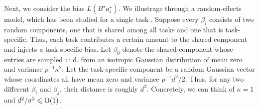 Next, we consider the bias $L(B^{\star} a^{\star}_i)$.
We illustrage through a random-effects model, which has been studied for a single task \cite{dobriban2020wonder}.
Suppose every $\beta_i$ consists of two random components, one that is shared among all tasks and one that is task-specific.
Thus, each task contributes a certain amount to the shared component and injects a task-specific bias.
Let $\beta_0$ denote the shared component whose entries are sampled i.i.d. from an isotropic Gaussian distribution of mean zero and variance $p^{-1}\kappa^2$.
Let the task-specific component be a random Gaussian vector whose coordinates all have mean zero and variance $p^{-1} d^2 / 2$.
Thus, for any two different $\beta_i$ and $\beta_j$, their distance is roughly $d^2$.
Concretely, we can think of $\kappa = 1$ and $d^2/\sigma^2 \leqslant \operatorname{O}(1)$.

